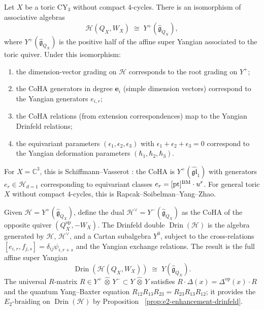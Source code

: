 \begin{theorem}[Critical CoHA \texorpdfstring{$=$}{=} positive half of the affine Yangian]
\label{thm:thy-coha-positive-half}
Let $X$ be a toric $\mathrm{CY}_3$ without compact $4$-cycles.
There is an isomorphism of associative algebras
\[
 \mathcal{H}(Q_X, W_X) \;\cong\; Y^+(\widehat{\mathfrak{g}}_{Q_X}),
\]
where $Y^+(\widehat{\mathfrak{g}}_{Q_X})$ is the positive half of the
affine super Yangian associated to the toric quiver. Under this
isomorphism:
\begin{enumerate}[label=\emph{(\roman*)}]
 \item the dimension-vector grading on $\mathcal{H}$ corresponds to
 the root grading on $Y^+$;
 \item the CoHA generators in degree $\mathbf{e}_i$ (simple dimension
 vectors) correspond to the Yangian generators $e_{i,r}$;
 \item the CoHA relations (from extension correspondences) map to the
 Yangian Drinfeld relations;
 \item the equivariant parameters $(\epsilon_1, \epsilon_2,
 \epsilon_3)$ with $\epsilon_1+\epsilon_2+\epsilon_3=0$ correspond
 to the Yangian deformation parameters $(\hbar_1, \hbar_2,
 \hbar_3)$.
\end{enumerate}
For $X = \mathbb{C}^3$, this is Schiffmann--Vasserot
\cite{SV-elliptic-hall, SV-cherednik-aha}: the CoHA is
$Y^+(\widehat{\mathfrak{gl}}_1)$ with generators $e_r \in
\mathcal{H}_{d=1}$ corresponding to equivariant classes $e_r =
[\mathrm{pt}]^{\operatorname{BM}}\cdot u^r$. For general toric $X$ without compact
$4$-cycles, this is Rapcak--Soibelman--Yang--Zhao.
\end{theorem}

\begin{construction}
\label{constr:thy-coha-drinfeld-double}
Given $\mathcal{H} = Y^+(\widehat{\mathfrak{g}}_{Q_X})$, define the
dual $\mathcal{H}^{\vee} = Y^-(\widehat{\mathfrak{g}}_{Q_X})$ as the
CoHA of the opposite quiver $(Q_X^{\mathrm{op}}, -W_X)$. The Drinfeld
double $\operatorname{Drin}(\mathcal{H})$ is the algebra generated by
$\mathcal{H}$, $\mathcal{H}^{\vee}$, and a Cartan subalgebra $Y^0$,
subject to the cross-relations $[e_{i,r}, f_{j,s}] = \delta_{ij}
\psi_{i,r+s}$ and the Yangian exchange relations. The result is the
full affine super Yangian
\[
 \operatorname{Drin}(\mathcal{H}(Q_X,W_X)) \;\cong\; Y(\widehat{\mathfrak{g}}_{Q_X}).
\]
The universal $R$-matrix $R \in Y^+\,\widehat{\otimes}\,Y^- \subset
Y\,\widehat{\otimes}\,Y$ satisfies $R\cdot\Delta(x) =
\Delta^{\mathrm{op}}(x)\cdot R$ and the quantum Yang--Baxter equation
$R_{12}R_{13}R_{23} = R_{23}R_{13}R_{12}$; it provides the
$E_2$-braiding on $\operatorname{Drin}(\mathcal{H})$ by Proposition~%
\ref{prop:e2-enhancement-drinfeld}.
\end{construction}

